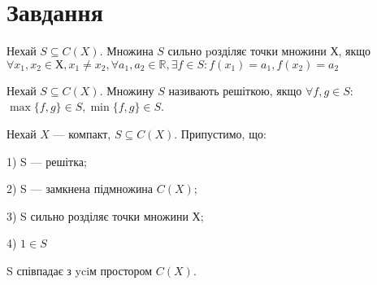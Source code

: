 \chapter{Завдання \theHchapter}

\begin{tcolorbox}[title=Означення 1]
    Нехай $S \subseteq C(X)$. 
    Множина $S$ сильно pозділяє точки множини $Х$, якщо
    $\forall x_1, x_2 \in Х, x_1 \neq x_2, \forall a_1, a_2 \in \mathbb{R},
    \exists f \in S: f(x_1) = a_1, f(x_2) = a_2$
\end{tcolorbox}

\begin{tcolorbox}[title=Означення 2]
    Нехай $S \subseteq C(X)$. Множину $S$ називають решіткою, 
    якщо $\forall f, g \in S$:
    $\max\{f,g\} \in S, \min\{f,g\} \in S$.
\end{tcolorbox}


\begin{tcolorbox}[title=теорема Какутанi–Крейна.]
    Нехай $X$ — компакт, $S \subseteq C(X)$. Припустимо, що:


    1) S — решітка;
    
    
    2) S — замкнена підмножина $C(X)$;
    
    
    3) S сильно розділяє точки множини Х;
    
    
    4) $1 \in S$
    
    
    S співпадає з yciм простором $C(X)$.
\end{tcolorbox}


